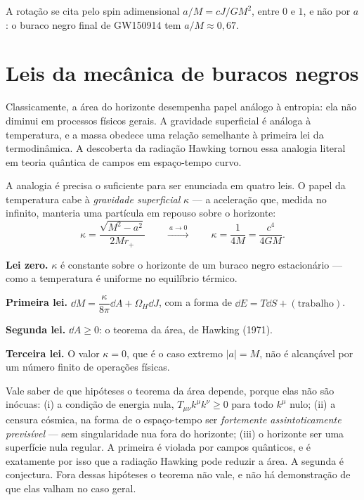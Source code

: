 \documentclass[12pt,a4paper,oneside]{book}
\theoremstyle{rgplain}
\theoremstyle{rgremark}
\begin{document}
A rotação se cita pelo spin adimensional $a/M=cJ/GM^2$, entre $0$ e $1$, e não
por $a$: o buraco negro final de GW150914 tem $a/M\approx0{,}67$.

\section{Leis da mecânica de buracos negros}

Classicamente, a área do horizonte desempenha papel análogo à entropia: ela
não diminui em processos físicos gerais. A gravidade superficial é análoga à
temperatura, e a massa obedece uma relação semelhante à primeira lei da
termodinâmica. A descoberta da radiação Hawking tornou essa analogia literal
em teoria quântica de campos em espaço-tempo curvo.

A analogia é precisa o suficiente para ser enunciada em quatro leis. O papel da
temperatura cabe à \emph{gravidade superficial} $\kappa$ --- a aceleração que,
medida no infinito, manteria uma partícula em repouso sobre o horizonte:
\[
  \kappa=\frac{\sqrt{M^2-a^2}}{2Mr_+}
  \qquad\xrightarrow{\ a\to0\ }\qquad
  \kappa=\frac{1}{4M}=\frac{c^4}{4GM}.
\]

\begin{etapas}
  \item \textbf{Lei zero.} $\kappa$ é constante sobre o horizonte de um buraco
  negro estacionário --- como a temperatura é uniforme no equilíbrio térmico.
  \item \textbf{Primeira lei.} $\dd M=\dfrac{\kappa}{8\pi}\dd A+\Omega_H\dd J$,
  com a forma de $\dd E=T\dd S+(\text{trabalho})$.
  \item \textbf{Segunda lei.} $\dd A\ge0$: o teorema da área, de Hawking
  (1971).
  \item \textbf{Terceira lei.} O valor $\kappa=0$, que é o caso extremo
  $|a|=M$, não é alcançável por um número finito de operações físicas.
\end{etapas}

Vale saber de que hipóteses o teorema da área depende, porque elas não são
inócuas: (i) a condição de energia nula, $T_{\mu\nu}k^\mu k^\nu\ge0$ para todo
$k^\mu$ nulo; (ii) a censura cósmica, na forma de o espaço-tempo ser
\emph{fortemente assintoticamente previsível} --- sem singularidade nua fora do
horizonte; (iii) o horizonte ser uma superfície nula regular. A primeira é
violada por campos quânticos, e é exatamente por isso que a radiação Hawking
pode reduzir a área. A segunda é conjectura. Fora dessas hipóteses o teorema
não vale, e não há demonstração de que elas valham no caso geral.
\end{document}
